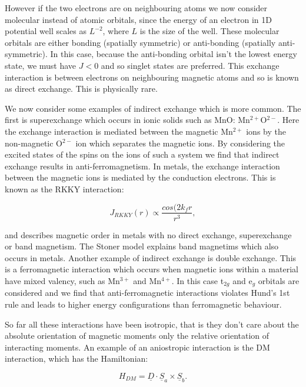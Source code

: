 \noindent However if the two electrons are on neighbouring atoms we now consider molecular instead of atomic orbitals, since the energy of an electron in 1D potential well scales as $L^{-2}$, where $L$ is the size of the well. These molecular orbitals are either bonding (spatially symmetric) or anti-bonding (spatially anti-symmetric). In this case, because the anti-bonding orbital isn't the lowest energy state, we must have $J<0$ and so singlet states are preferred. This exchange interaction is between electrons on neighbouring magnetic atoms and so is known as direct exchange. This is physically rare.

\noindent We now consider some examples of indirect exchange which is more common.
The first is superexchange which occurs in ionic solids such as MnO: Mn$^{2+}$O$^{2-}$. Here the exchange interaction is mediated between the magnetic Mn$^{2+}$ ions by the non-magnetic O$^{2-}$ ion which separates the magnetic ions. By considering the excited states of the spins on the ions of such a system we find that indirect exchange results in anti-ferromagnetism.
In metals, the exchange interaction between the magnetic ions is mediated by the conduction electrons. This is known as the RKKY interaction:

\begin{equation}
    J_{RKKY}(r) \propto \frac{cos(2k_fr}{r^3},
    \label{IndirectInteractionRKKY}
\end{equation}

\noindent and describes magnetic order in metals with no direct exchange, superexchange or band magnetism. The Stoner model explains band magnetims which also occurs in metals.
Another example of indirect exchange is double exchange. This is a ferromagnetic interaction which occurs when magnetic ions within a material have mixed valency, such as Mn$^{3+}$ and Mn$^{4+}$. In this case t$_{2g}$ and e$_g$ orbitals are considered and we find that anti-ferromagnetic interactions violates Hund's 1st rule and leads to higher energy configurations than ferromagnetic behaviour.

\noindent So far all these interactions have been isotropic, that is they don't care about the absolute orientation of magnetic moments only the relative orientation of interacting moments. An example  of an aniostropic interaction is the DM interaction, which has the Hamiltonian:

\begin{equation}
    H_{DM} = \underline{D} \cdot \underline{S}_a \times \underline{S}_b.
    \label{AnisotropicInteractionDM}
\end{equation}

